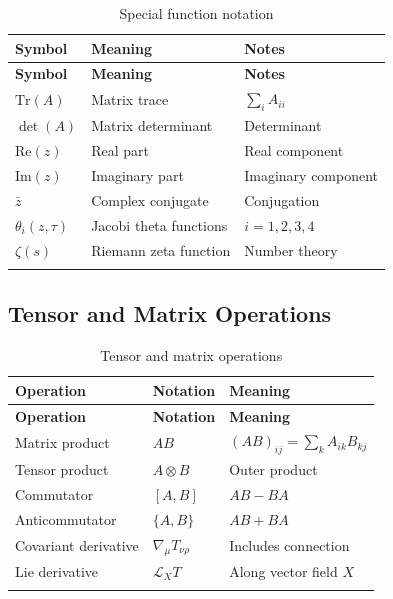 \begin{longtable}{|l|p{6cm}|p{5cm}|}
\hline
\textbf{Symbol} & \textbf{Meaning} & \textbf{Notes} \\
\hline
\endfirsthead
\hline
\textbf{Symbol} & \textbf{Meaning} & \textbf{Notes} \\
\hline
\endhead

$\text{Tr}(A)$ & Matrix trace & $\sum_i A_{ii}$ \\
\hline
$\det(A)$ & Matrix determinant & Determinant \\
\hline
$\text{Re}(z)$ & Real part & Real component \\
\hline
$\text{Im}(z)$ & Imaginary part & Imaginary component \\
\hline
$\bar{z}$ & Complex conjugate & Conjugation \\
\hline
$\theta_i(z,\tau)$ & Jacobi theta functions & $i=1,2,3,4$ \\
\hline
$\zeta(s)$ & Riemann zeta function & Number theory \\
\hline

\caption{Special function notation}
\label{tab:canonical:special_functions}
\end{longtable}

\subsection{Tensor and Matrix Operations}

\begin{longtable}{|l|p{6cm}|p{5cm}|}
\hline
\textbf{Operation} & \textbf{Notation} & \textbf{Meaning} \\
\hline
\endfirsthead
\hline
\textbf{Operation} & \textbf{Notation} & \textbf{Meaning} \\
\hline
\endhead

Matrix product & $AB$ & $(AB)_{ij} = \sum_k A_{ik}B_{kj}$ \\
\hline
Tensor product & $A \otimes B$ & Outer product \\
\hline
Commutator & $[A,B]$ & $AB - BA$ \\
\hline
Anticommutator & $\{A,B\}$ & $AB + BA$ \\
\hline
Covariant derivative & $\nabla_\mu T_{\nu\rho}$ & Includes connection \\
\hline
Lie derivative & $\mathcal{L}_X T$ & Along vector field $X$ \\
\hline

\caption{Tensor and matrix operations}
\label{tab:canonical:tensor_operations}
\end{longtable}

